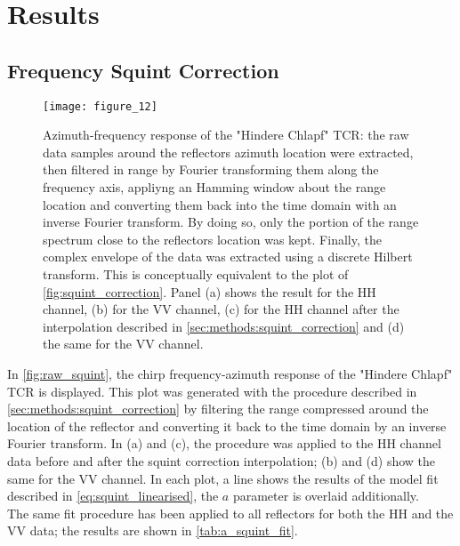 \section{Results}\label{sec:results}
\subsection{Frequency Squint Correction}\label{sec:results:squint_correction}
\begin{figure*}[ht]
	\centering
	\texttt{[image: figure\_12]}
	\caption{Azimuth-frequency response of the "Hindere Chlapf" TCR: the raw data samples around the reflectors azimuth location were extracted, then filtered in range by Fourier transforming them along the frequency axis, appliyng an Hamming window about the range location and converting them  back into the time domain with an inverse Fourier transform. By doing so, only the portion of the range spectrum close to the reflectors location was kept. Finally, the complex envelope of the data was extracted using a discrete Hilbert transform. This is conceptually equivalent to the plot of \autoref{fig:squint_correction}. Panel (a) shows the result for the HH channel, (b) for the VV channel, (c) for the HH channel after the interpolation described in \autoref{sec:methods:squint_correction}  and (d) the same for the VV channel.}
	\label{fig:raw_squint}
\end{figure*}
In \autoref{fig:raw_squint}, the chirp frequency-azimuth response of the "Hindere Chlapf" TCR is displayed. This plot was generated with the procedure described in \autoref{sec:methods:squint_correction} by filtering the range compressed around the location of the reflector and converting it back to the time domain by an inverse Fourier transform. In (a) and (c), the procedure was applied to the HH channel data before and after the squint correction interpolation; (b) and (d) show the same for the VV channel. In each plot, a line shows the results of the model fit described in \autoref{eq:squint_linearised}, the $a$ parameter is overlaid additionally.\\
The same fit procedure has been applied to all reflectors for both the HH and the VV data; the results are shown in \autoref{tab:a_squint_fit}.\\
